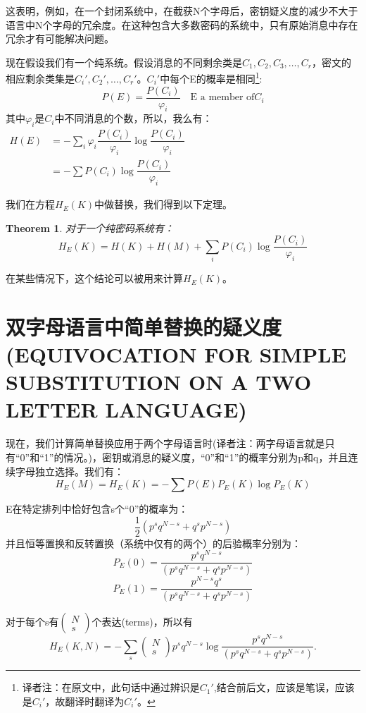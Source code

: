 \documentclass[]{article}
\newtheorem{theorem}{Theorem}
\begin{document}
这表明，例如，在一个封闭系统中，在截获N个字母后，密钥疑义度的减少不大于语言中N个字母的冗余度。在这种包含大多数密码的系统中，只有原始消息中存在冗余才有可能解决问题。

现在假设我们有一个纯系统。假设消息的不同剩余类是$C_1,C_2,C_3,\ldots,C_r$，密文的相应剩余类集是$C_i',C_2',\ldots,C_r'$。$C_i'$中每个E的概率是相同\footnote{译者注：在原文中，此句话中通过辨识是$C_1'$,结合前后文，应该是笔误，应该是$C_i'$，故翻译时翻译为$C_i'$。}:
\[P(E)=\dfrac{P(C_i)}{\varphi_i}\quad \text{E a member of} C_i\]
其中$\varphi_i$是$C_i$中不同消息的个数，所以，我么有：\\
$\begin{matrix}
H(E) & = -\sum_{i}{\varphi_i \dfrac{P(C_i)}{\varphi_i} \log{\dfrac{P(C_i)}{\varphi_i}}}\\
     & = -\sum {P(C_i)\log{\dfrac{P(C_i)}{\varphi_i}}} 
\end{matrix}$

我们在方程$H_E(K)$中做替换，我们得到以下定理。

\begin{theorem}
	对于一个纯密码系统有：
	\[H_E(K) = H(K) + H(M) + \sum_{i} {P(C_i)\log{\dfrac{P(C_i)}{\varphi_i}}}\]
\end{theorem}

在某些情况下，这个结论可以被用来计算$H_E(K)$。

\newpage
%   
%

\section{双字母语言中简单替换的疑义度(EQUIVOCATION FOR SIMPLE SUBSTITUTION ON A TWO LETTER LANGUAGE)}

现在，我们计算简单替换应用于两个字母语言时(译者注：两字母语言就是只有“0”和“1”的情况。)，密钥或消息的疑义度，“0”和“1”的概率分别为p和q，并且连续字母独立选择。我们有：
\[H_E(M)=H_E(K)=-\sum {P(E)P_E(K)\log{P_E(K)}}\]

E在特定排列中恰好包含s个“0”的概率为：
\[\dfrac{1}{2} (p^s q^{N-s}+q^s p^{N-s})\]
并且恒等置换和反转置换（系统中仅有的两个）的后验概率分别为：
\[P_E(0)=\dfrac{p^s q^{N-s}}{(p^s q^{N-s}+q^s p^{N-s})}\]
\[P_E(1)=\dfrac{p^{N-s}q^s}{(p^s q^{N-s} + q^s p^{N-s})}\]

对于每个s有$\begin{pmatrix}
N\\
s
\end{pmatrix}$个表达(terms)，所以有
\[H_E(K,N) = -\sum_{s} \begin{pmatrix}
N\\
s\end{pmatrix} p^s q^{N-s} \log{\dfrac{p^s q^{N-s}}{(p^s q^{N-s}+q^s p^{N-s})}}.\]
\end{document}
